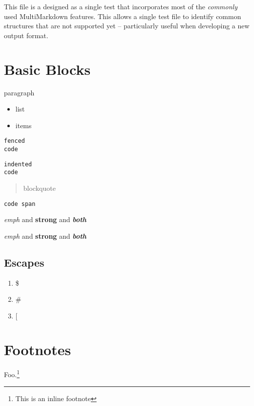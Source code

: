 This file is a designed as a single test that incorporates most of the
\emph{commonly} used MultiMarkdown features. This allows a single test file to
identify common structures that are not supported yet -- particularly useful
when developing a new output format.

\part{Basic Blocks }
\label{basicblocks}

paragraph

\begin{itemize}
\item list

\item items

\end{itemize}

\begin{verbatim}
fenced
code
\end{verbatim}

\begin{verbatim}
indented
code
\end{verbatim}

\begin{quote}
blockquote
\end{quote}

\texttt{code span}

\emph{emph} and \textbf{strong} and \textbf{\emph{both}}

\emph{emph} and \textbf{strong} and \textbf{\emph{both}}

\chapter{Escapes }
\label{escaped}

\begin{enumerate}
\item \$

\item \#

\item [

\end{enumerate}

\part{Footnotes }
\label{footnotes}

Foo.\footnote{This is an inline footnote}

